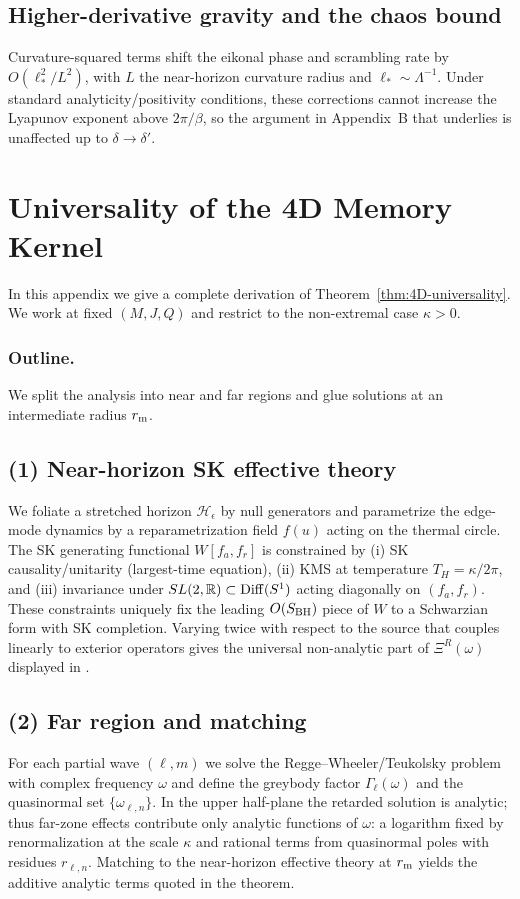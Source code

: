 \documentclass[11pt,a4paper]{article}
\theoremstyle{plain}
\theoremstyle{definition}
\theoremstyle{remark}
\begin{document}
\subsection{Higher-derivative gravity and the chaos bound}
Curvature-squared terms shift the eikonal phase and scrambling rate by $O(\ell_\ast^2/L^2)$, with $L$ the near-horizon curvature radius and $\ell_\ast\sim \Lambda^{-1}$.
Under standard analyticity/positivity conditions, these corrections cannot increase the Lyapunov exponent above $2\pi/\beta$, so the argument in Appendix~B that underlies  is unaffected up to $\delta\to\delta'$.

\section{Universality of the 4D Memory Kernel}
\label{app:4D_universality} %
In this appendix we give a complete derivation of Theorem~\ref{thm:4D-universality}. We work at fixed $(M,J,Q)$ and restrict to the non-extremal case $\kappa>0$.

\subsubsection{Outline.} We split the analysis into near and far regions and glue solutions at an intermediate radius $r_{\rm m}$.

\subsection*{(1) Near-horizon SK effective theory}
We foliate a stretched horizon $\mathcal{H}_\epsilon$ by null generators and parametrize the edge-mode dynamics by a reparametrization field $f(u)$ acting on the thermal circle. The SK generating functional $W[f_a,f_r]$ is constrained by (i) SK causality/unitarity (largest-time equation), (ii) KMS at temperature $T_H=\kappa/2\pi$, and (iii) invariance under $SL(2,\mathbb{R})\subset{\rm Diff}(S^1)$ acting diagonally on $(f_a,f_r)$. These constraints uniquely fix the leading $O(S_{\rm BH})$ piece of $W$ to a Schwarzian form with SK completion. Varying twice with respect to the source that couples linearly to exterior operators gives the universal non-analytic part of $\Xi^R(\omega)$ displayed in .

\subsection*{(2) Far region and matching}
For each partial wave $(\ell,m)$ we solve the Regge--Wheeler/Teukolsky problem with complex frequency $\omega$ and define the greybody factor $\Gamma_\ell(\omega)$ and the quasinormal set $\{\omega_{\ell,n}\}$. In the upper half-plane the retarded solution is analytic; thus far-zone effects contribute only analytic functions of $\omega$: a logarithm fixed by renormalization at the scale $\kappa$ and rational terms from quasinormal poles with residues $r_{\ell,n}$. Matching to the near-horizon effective theory at $r_{\rm m}$ yields the additive analytic terms quoted in the theorem.
\end{document}
